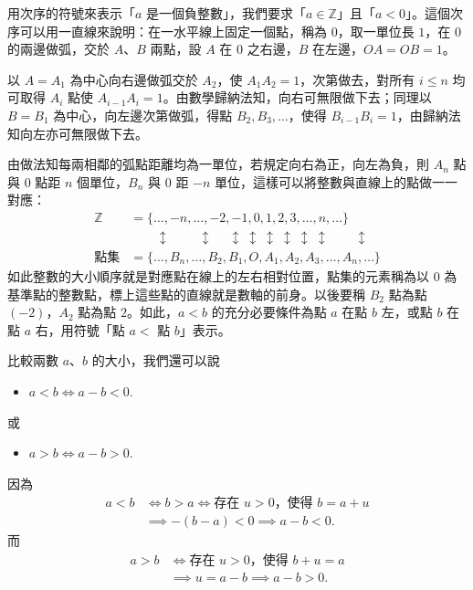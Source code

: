 用次序的符號來表示「$a$ 是一個負整數」，我們要求「$a \in \mathbb{Z}$」且「$a < 0$」。這個次序可以用一直線來說明：在一水平線上固定一個點，稱為 $0$，取一單位長 $1$，在 $0$ 的兩邊做弧，交於 $A$、$B$ 兩點，設 $A$ 在 $0$ 之右邊，$B$ 在左邊，$OA = OB = 1$。

\begin{figure}[htbp]
\centering
{}
\end{figure}

以 $A = A_1$ 為中心向右邊做弧交於 $A_2$，使 $A_1 A_2 = 1$，次第做去，對所有 $i \le n$ 均可取得 $A_i$ 點使 $A_{i-1} A_i = 1$。由數學歸納法知，向右可無限做下去；同理以 $B = B_1$ 為中心，向左邊次第做弧，得點 $B_2, B_3, \dots$，使得 $B_{i-1} B_i = 1$，由歸納法知向左亦可無限做下去。

由做法知每兩相鄰的弧點距離均為一單位，若規定向右為正，向左為負，則 $A_n$ 點與 $0$ 點距 $n$ 個單位，$B_n$ 與 $0$ 距 $-n$ 單位，這樣可以將整數與直線上的點做一一對應：
\begin{align*}
  \mathbb{Z} &= \{\dots, -n, \dots, -2, -1, 0, 1, 2, 3, \dots, n, \dots\} \\
  &\quad\quad \updownarrow \quad\quad\ \updownarrow \quad\ \updownarrow \ \updownarrow \ \updownarrow \ \updownarrow \ \updownarrow \ \updownarrow \quad\quad \updownarrow \\
  \text{點集} &= \{\dots, B_n, \dots, B_2, B_1, O, A_1, A_2, A_3, \dots, A_n, \dots\}
\end{align*}
如此整數的大小順序就是對應點在線上的左右相對位置，點集的元素稱為以 $0$ 為基準點的整數點，標上這些點的直線就是數軸的前身。以後要稱 $B_2$ 點為點 $(-2)$，$A_2$ 點為點 $2$。如此，$a < b$ 的充分必要條件為點 $a$ 在點 $b$ 左，或點 $b$ 在點 $a$ 右，用符號「點 $a <$ 點 $b$」表示。

比較兩數 $a$、$b$ 的大小，我們還可以說
\begin{itemize}
  \item[(i)] $a < b \iff a-b < 0$.
\end{itemize}
或
\begin{itemize}
  \item[(ii)] $a > b \iff a-b > 0$.
\end{itemize}
因為
\begin{align*}
  a < b &\iff b > a \iff \text{存在 } u > 0 \text{，使得 } b = a+u \\
  &\implies -(b-a) < 0 \implies a-b < 0.
\end{align*}
而
\begin{align*}
  a > b &\iff \text{存在 } u > 0 \text{，使得 } b+u = a \\
  &\implies u = a-b \implies a-b > 0.
\end{align*}

